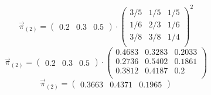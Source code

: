\documentclass{templateNote}
\begin{document}
\begin{enumerate}[label=\alph*)]
    \begin{equation*}
        \vec{\pi}_{(2)} = 
        \begin{pmatrix}
            0.2 & 0.3 & 0.5
        \end{pmatrix}
        \cdot
        \begin{pmatrix}
            3/5 & 1/5 & 1/5 \\
            1/6 & 2/3 & 1/6 \\
            3/8 & 3/8 & 1/4 \\
        \end{pmatrix}^2
    \end{equation*}
    \begin{equation*}
        \vec{\pi}_{(2)} = 
        \begin{pmatrix}
            0.2 & 0.3 & 0.5
        \end{pmatrix}
        \cdot
        \begin{pmatrix}
            0.4683 & 0.3283 & 0.2033 \\
            0.2736 & 0.5402 & 0.1861 \\
            0.3812 & 0.4187 & 0.2 \\
        \end{pmatrix}
    \end{equation*}
    \begin{equation*}
        \vec{\pi}_{(2)} = 
        \begin{pmatrix}
            0.3663 & 0.4371 & 0.1965
        \end{pmatrix}
    \end{equation*}


\end{enumerate}
\end{document}
